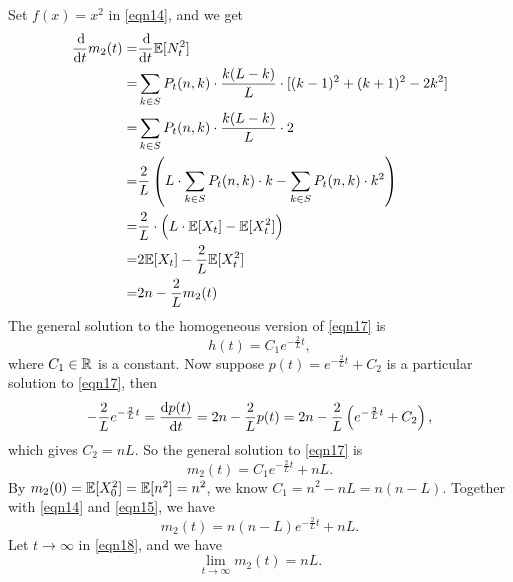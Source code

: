\begin{enumerate}
        Set $f(x) = x^2$ in \eqref{eqn14}, and we get 
        \begin{align}\label{eqn17}
            \frac{\dif}{\dif t}m_2(t)
            = & \frac{\dif}{\dif t} \mbb{E} [N_t^2] \notag \\ 
            = & \sum_{k \in S} P_t(n,k) \cdot \frac{k (L- k)}{L} \cdot [(k-1)^2 + (k+1)^2 -2 k^2] \notag \\ 
            = &  \sum_{k \in S} P_t(n,k) \cdot \frac{k (L- k)}{L} \cdot 2 \notag \\
            = & \frac{2}{L}  \left(L \cdot \sum_{k \in S} P_t(n,k) \cdot k - \sum_{k \in S} P_t(n,k)\cdot k^2\right) \notag \\ 
            = & \frac{2}{L} \cdot \left( L \cdot \mbb{E}[X_t] - \mbb{E}[X_t^2]\right) \notag \\ 
            = & 2 \mbb{E} [X_t] - \frac{2}{L} \mbb{E}[X_t^2]  \notag \\ 
            = & 2n - \frac{2}{L} m_2(t)
        \end{align}
        The general solution to the homogeneous version of \eqref{eqn17} is 
        \begin{equation*}
            h(t) = C_1 e^{-\frac{2}{L}t},
        \end{equation*}
        where $C_1 \in \mathbb{R}$ is a constant. Now suppose $p(t) = e^{-\frac{2}{L}t} + C_2$ is a particular solution to \eqref{eqn17}, then 
        \begin{equation*}
            -\frac{2}{L} e^{-\frac{2}{L}t}= \frac{\dif p(t)}{\dif t} = 2n - \frac{2}{L}p(t) = 2n - \frac{2}{L} \left(e^{-\frac{2}{L}t} + C_2 \right),
        \end{equation*}
        which gives $C_2 = nL$. So the general solution to \eqref{eqn17} is 
        \begin{equation*}
            m_2(t) = C_1 e^{-\frac{2}{L}t} + nL.
        \end{equation*}
        By $m_2(0) = \mathbb{E} [X_0^2] = \mathbb{E}[n^2] = n^2$, we know $C_1 = n^2 - nL = n(n-L)$. Together with \eqref{eqn14} and \eqref{eqn15}, we have 
        \begin{equation}\label{eqn18}
            m_2(t) = n(n-L)e^{-\frac{2}{L}t} + nL.
        \end{equation}
        Let $t \to \infty$ in \eqref{eqn18}, and we have 
        \begin{equation*}
            \lim_{t \to \infty} m_2(t) = nL.
        \end{equation*}


\end{enumerate}

